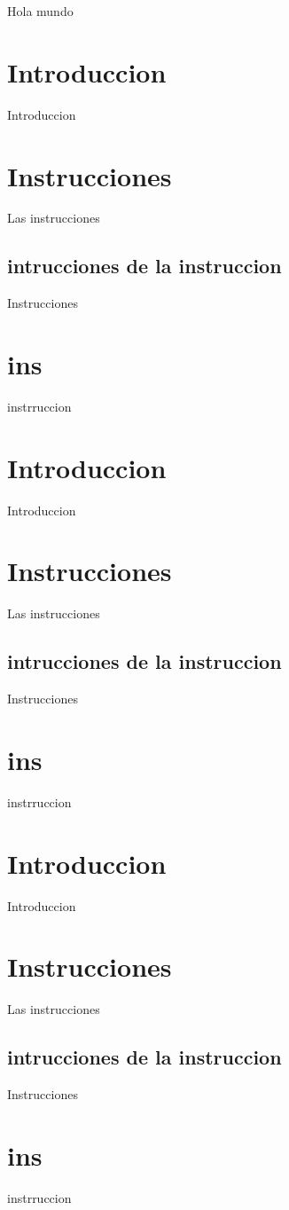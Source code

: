 \maketitle
	Hola mundo
\section{Introduccion}
Introduccion
\section{Instrucciones}
	Las instrucciones	
	\subsection{intrucciones de la instruccion}
	Instrucciones
	
\section{ins}
instrruccion

\section{Introduccion}
Introduccion
\section{Instrucciones}
	Las instrucciones	
	\subsection{intrucciones de la instruccion}
	Instrucciones
	
\section{ins}
instrruccion

\section{Introduccion}
Introduccion
\section{Instrucciones}
	Las instrucciones	
	\subsection{intrucciones de la instruccion}
	Instrucciones	
\section{ins}
instrruccion
